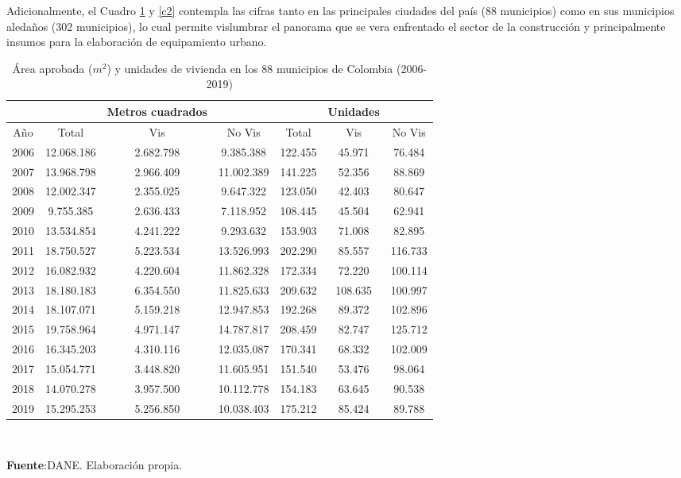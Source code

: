 \documentclass[12pt]{article}
\begin{document}
Adicionalmente, el Cuadro \ref{c1} y \ref{c2} contempla las cifras tanto en las principales ciudades del país (88 municipios) como en sus municipios aledaños (302 municipios), lo cual permite vislumbrar el panorama que se vera enfrentado el sector de la construcción y principalmente insumos para la elaboración de equipamiento urbano.
\begin{table}[htbp]
\centering
\caption{Área aprobada ($m^2$) y unidades de vivienda en los 88 municipios de Colombia (2006-2019)}
\begin{tabular}{ c | c c c | c c c }
\hline
&       & \multicolumn{1}{l}{Metros cuadrados} &       &       & \multicolumn{1}{l}{Unidades}  &  \\
\hline
\hline
Año   &Total & Vis & No Vis &Total & Vis & No Vis\\
\hline
2006  & 12.068.186 & 2.682.798 & 9.385.388 & 122.455 & 45.971 & 76.484 \\
2007  & 13.968.798 & 2.966.409 & 11.002.389 & 141.225 & 52.356 & 88.869 \\
2008  & 12.002.347 & 2.355.025 & 9.647.322 & 123.050 & 42.403 & 80.647 \\
2009  & 9.755.385 & 2.636.433 & 7.118.952 & 108.445 & 45.504 & 62.941 \\
2010  & 13.534.854 & 4.241.222 & 9.293.632 & 153.903 & 71.008 & 82.895 \\
2011  & 18.750.527 & 5.223.534 & 13.526.993 & 202.290 & 85.557 & 116.733 \\
2012  & 16.082.932 & 4.220.604 & 11.862.328 & 172.334 & 72.220 & 100.114 \\
2013  & 18.180.183 & 6.354.550 & 11.825.633 & 209.632 & 108.635 & 100.997 \\
2014  & 18.107.071 & 5.159.218 & 12.947.853 & 192.268 & 89.372 & 102.896 \\
2015  & 19.758.964 & 4.971.147 & 14.787.817 & 208.459 & 82.747 & 125.712 \\
2016  & 16.345.203 & 4.310.116 & 12.035.087 & 170.341 & 68.332 & 102.009 \\
2017  & 15.054.771 & 3.448.820 & 11.605.951 & 151.540 & 53.476 & 98.064 \\
2018  & 14.070.278 & 3.957.500 & 10.112.778 & 154.183 & 63.645 & 90.538 \\
2019  & 15.295.253 & 5.256.850 & 10.038.403 & 175.212 & 85.424 & 89.788 \\
\hline
\end{tabular}%
\\
\raggedright  \scriptsize \textbf{Fuente}:DANE. Elaboración propia.
\label{c1}%
\end{table}%
\end{document}

